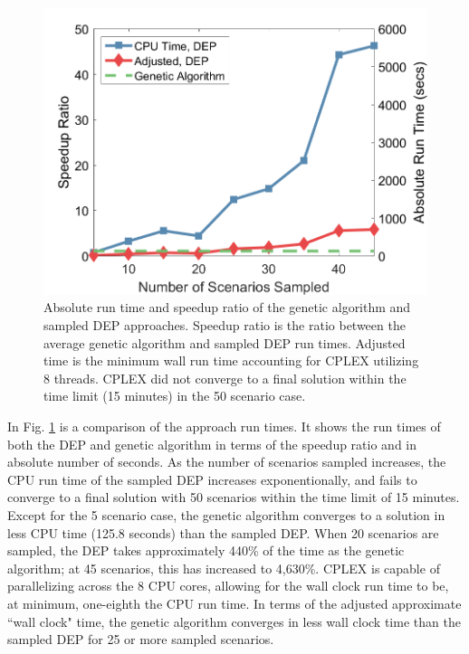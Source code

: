 \documentclass[conference]{IEEEtran}
\begin{document}
\begin{figure}
	\centering
	\includegraphics[width=.45\textwidth]{Figures/VOSGA_SpeedupRatio_AbsComp_alpha20}
	\caption{Absolute run time and speedup ratio of the genetic algorithm and sampled DEP approaches.  Speedup ratio is the ratio between the average genetic algorithm and sampled DEP run times.  Adjusted time is the minimum wall run time accounting for CPLEX utilizing 8 threads.  CPLEX did not converge to a final solution within the time limit (15 minutes) in the 50 scenario case.}
	\label{fig:AlgSpeedupRunTime}
\end{figure}

In Fig. \ref{fig:AlgSpeedupRunTime} is a comparison of the approach run times.  It shows the run times of both the DEP and genetic algorithm in terms of the speedup ratio and in absolute number of seconds.  As the number of scenarios sampled increases, the CPU run time of the sampled DEP increases exponentionally, and fails to converge to a final solution with 50 scenarios within the time limit of 15 minutes.  Except for the 5 scenario case, the genetic algorithm converges to a solution in less CPU time (125.8 seconds) than the sampled DEP.  When 20 scenarios are sampled, the DEP takes approximately 440\% of the time as the genetic algorithm; at 45 scenarios, this has increased to 4,630\%.  CPLEX is capable of parallelizing across the 8 CPU cores, allowing for the wall clock run time to be, at minimum, one-eighth the CPU run time.  In terms of the adjusted approximate ``wall clock" time, the genetic algorithm converges in less wall clock time than the sampled DEP for 25 or more sampled scenarios.
\end{document}
